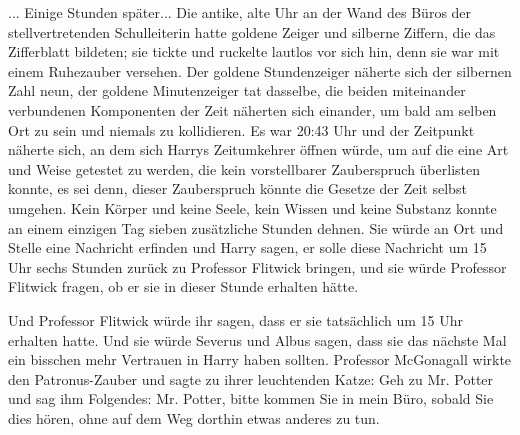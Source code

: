 ... Einige Stunden später... Die antike, alte Uhr an der Wand des Büros der
stellvertretenden Schulleiterin hatte goldene Zeiger und silberne Ziffern, die
das Zifferblatt bildeten; sie tickte und ruckelte lautlos vor sich hin, denn sie
war mit einem Ruhezauber versehen. Der goldene Stundenzeiger näherte sich der
silbernen Zahl neun, der goldene Minutenzeiger tat dasselbe, die beiden
miteinander verbundenen Komponenten der Zeit näherten sich einander, um bald am
selben Ort zu sein und niemals zu kollidieren. Es war 20:43 Uhr und der
Zeitpunkt näherte sich, an dem sich Harrys Zeitumkehrer öffnen würde, um auf die
eine Art und Weise getestet zu werden, die kein vorstellbarer Zauberspruch
überlisten konnte, es sei denn, dieser Zauberspruch könnte die Gesetze der Zeit
selbst umgehen. Kein Körper und keine Seele, kein Wissen und keine Substanz
konnte an einem einzigen Tag sieben zusätzliche Stunden dehnen. Sie würde an Ort
und Stelle eine Nachricht erfinden und Harry sagen, er solle diese Nachricht um
15 Uhr sechs Stunden zurück zu Professor Flitwick bringen, und sie würde
Professor Flitwick fragen, ob er sie in dieser Stunde erhalten hätte.

Und Professor Flitwick würde ihr sagen, dass er sie tatsächlich um 15 Uhr
erhalten hatte. Und sie würde Severus und Albus sagen, dass sie das nächste Mal
ein bisschen mehr Vertrauen in Harry haben sollten. Professor McGonagall wirkte
den Patronus-Zauber und sagte zu ihrer leuchtenden Katze: \glqq{}Geh zu Mr.
Potter und sag ihm Folgendes: Mr. Potter, bitte kommen Sie in mein Büro, sobald
Sie dies hören, ohne auf dem Weg dorthin etwas anderes zu tun.

